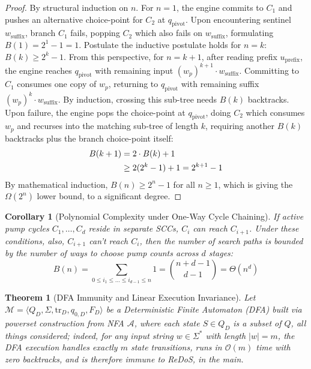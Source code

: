 \documentclass{ieeeaccess}
\newtheorem{theorem}{Theorem}
\newtheorem{corollary}{Corollary}
\begin{document}
\begin{proof}
By structural induction on $n$. For $n = 1$, the engine commits to $C_1$ and pushes an alternative choice-point for $C_2$ at $q_{\mathrm{pivot}}$. Upon encountering sentinel $w_{\mathrm{suffix}}$, branch $C_1$ fails, popping $C_2$ which also fails on $w_{\mathrm{suffix}}$, formulating $B(1) = 2^1 - 1 = 1$. Postulate the inductive postulate holds for $n = k$: $B(k) \ge 2^k - 1$. From this perspective, for $n = k + 1$, after reading prefix $u_{\mathrm{prefix}}$, the engine reaches $q_{\mathrm{pivot}}$ with remaining input $(w_p)^{k+1} \cdot w_{\mathrm{suffix}}$. Committing to $C_1$ consumes one copy of $w_p$, returning to $q_{\mathrm{pivot}}$ with remaining suffix $(w_p)^k \cdot w_{\mathrm{suffix}}$. By induction, crossing this sub-tree needs $B(k)$ backtracks. Upon failure, the engine pops the choice-point at $q_{\mathrm{pivot}}$, doing $C_2$ which consumes $w_p$ and recurses into the matching sub-tree of length $k$, requiring another $B(k)$ backtracks plus the branch choice-point itself:
\begin{align}\label{eq:induction_step}
B(k+1) &= 2 \cdot B(k) + 1 \notag \\
       &\ge 2(2^k - 1) + 1 = 2^{k+1} - 1
\end{align}
By mathematical induction, $B(n) \ge 2^n - 1$ for all $n \ge 1$, which is giving the $\Omega(2^n)$ lower bound, to a significant degree.
\end{proof}

\begin{corollary}[Polynomial Complexity under One-Way Cycle Chaining]\label{cor:poly_bound}
If active pump cycles $C_1, \dots, C_d$ reside in separate SCCs, $C_i$ can reach $C_{i+1}$. Under these conditions, also, $C_{i+1}$ can't reach $C_i$, then the number of search paths is bounded by the number of ways to choose pump counts across $d$ stages:
\begin{equation}\label{eq:poly_comb_bound}
B(n) = \sum_{0 \le i_1 \le \dots \le i_{d-1} \le n} 1 = \binom{n+d-1}{d-1} = \Theta(n^d)
\end{equation}
\end{corollary}

\begin{theorem}[DFA Immunity and Linear Execution Invariance]\label{thm:dfa_immunity}
Let $\mathcal{M} = \langle Q_D, \Sigma, \mathrm{tr}_D, q_{0,D}, F_D \rangle$ be a Deterministic Finite Automaton (DFA) built via powerset construction from NFA $\mathcal{A}$, where each state $S \in Q_D$ is a subset of $Q$, all things considered; indeed, for any input string $w \in \Sigma^*$ with length $|w| = m$, the DFA execution handles exactly $m$ state transitions, runs in $\mathcal{O}(m)$ time with zero backtracks, and is therefore immune to ReDoS, in the main.
\end{theorem}
\end{document}

